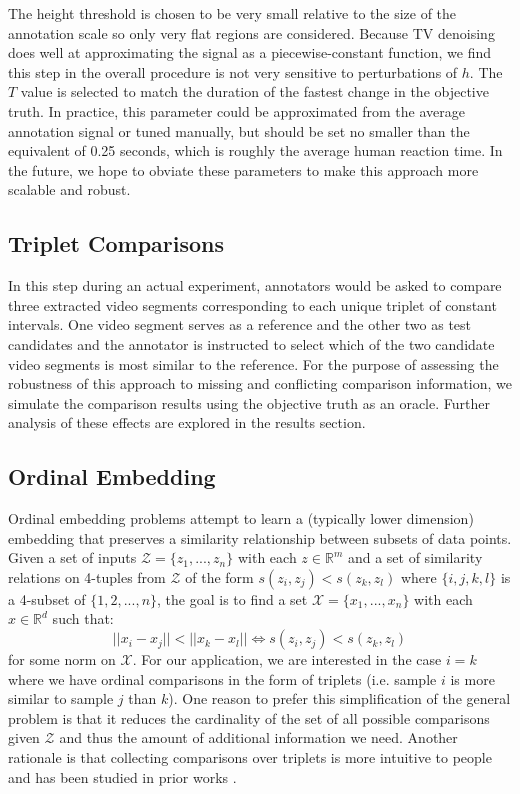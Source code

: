\documentclass[10pt,letterpaper]{article}
\begin{document}
The height threshold is chosen to be very small relative to the size of the annotation scale so only very flat regions are considered.  Because TV denoising does well at approximating the signal as a piecewise-constant function, we find this step in the overall procedure is not very sensitive to perturbations of $h$.  The $T$ value is selected to match the duration of the fastest change in the objective truth.  In practice, this parameter could be approximated from the average annotation signal or tuned manually, but should be set no smaller than the equivalent of 0.25 seconds, which is roughly the average human reaction time.  In the future, we hope to obviate these parameters to make this approach more scalable and robust.

\subsection*{Triplet Comparisons}
In this step during an actual experiment, annotators would be asked to compare three extracted video segments corresponding to each unique triplet of constant intervals.  One video segment serves as a reference and the other two as test candidates and the annotator is instructed to select which of the two candidate video segments is most similar to the reference.  For the purpose of assessing the robustness of this approach to missing and conflicting comparison information, we simulate the comparison results using the objective truth as an oracle.  Further analysis of these effects are explored in the results section.

\subsection*{Ordinal Embedding}
Ordinal embedding problems attempt to learn a (typically lower dimension) embedding that preserves a similarity relationship between subsets of data points.  Given a set of inputs $\mathcal{Z} = \{z_1,...,z_n\}$ with each $z \in \mathbb{R}^m$ and a set of similarity relations on 4-tuples from $\mathcal{Z}$ of the form $s(z_i,z_j) < s(z_k,z_l)$ where $\{i,j,k,l\}$ is a 4-subset of $\{1,2,...,n\}$, the goal is to find a set $\mathcal{X} = \{x_1,...,x_n\}$ with each $x \in \mathbb{R}^d$ such that:
\begin{equation*}
||x_i-x_j|| < ||x_k-x_l|| \Longleftrightarrow s(z_i,z_j) < s(z_k,z_l)
\end{equation*}
\noindent
for some norm on $\mathcal{X}$. For our application, we are interested in the case $i=k$ where we have ordinal comparisons in the form of triplets (i.e. sample $i$ is more similar to sample $j$ than $k$).  One reason to prefer this simplification of the general problem is that it reduces the cardinality of the set of all possible comparisons given $\mathcal{Z}$ and thus the amount of additional information we need.  Another rationale is that collecting comparisons over triplets is more intuitive to people and has been studied in prior works \cite{jain2016finite, van2012stochastic}.
\end{document}
